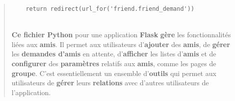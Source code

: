 \documentclass{article}
\begin{document}
\begin{quote}
\begin{tcolorbox}[colback=grisClair,colframe=black]
\begin{lstlisting}
    return redirect(url_for('friend.friend_demand'))


                \end{lstlisting}       
            \end{tcolorbox}
            \vspace*{1\baselineskip}
\textbf{Ce fichier Python} pour une application \textbf{Flask} \textbf{gère} les fonctionnalités liées aux \textbf{amis}. 
Il permet aux utilisateurs d'\textbf{ajouter} des \textbf{amis}, de \textbf{gérer} les \textbf{demandes d'amis} en attente, 
d'\textbf{afficher} les listes d'\textbf{amis} et de \textbf{configurer} des \textbf{paramètres} relatifs aux \textbf{amis}, comme les pages de \textbf{groupe}. 
C'est essentiellement un ensemble d'\textbf{outils} qui permet aux utilisateurs de \textbf{gérer} leurs \textbf{relations} avec d'autres utilisateurs de l'application.
\end{quote}
\end{document}
